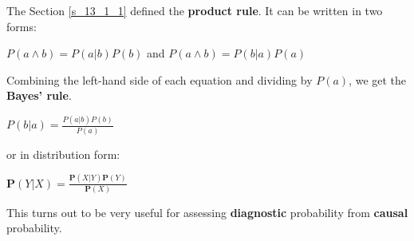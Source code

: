 The Section \ref{s_13_1_1} defined the \textbf{product rule}. It can be written in two forms:
\begin{center}
    $P(a \wedge b) = P(a|b)P(b)$ and $P(a \wedge b) = P(b|a)P(a)$
\end{center}
Combining the left-hand side of each equation and dividing by $P(a)$, we get the \textbf{Bayes' rule}.
\begin{definition}[title={Bayes' theorem}]
    \begin{center}
        $P(b|a) = \frac{P(a|b)P(b)}{P(a)}$ 
    \end{center} \vspace{3.5pt}
    or in distribution form:
    \begin{center}
        $\mathbf{P}(Y|X) = \frac{\mathbf{P}(X|Y)\mathbf{P}(Y)}{\mathbf{P}(X)}$ 
    \end{center}
\end{definition}
This turns out to be very useful for assessing \textbf{diagnostic} probability from \textbf{causal} probability.